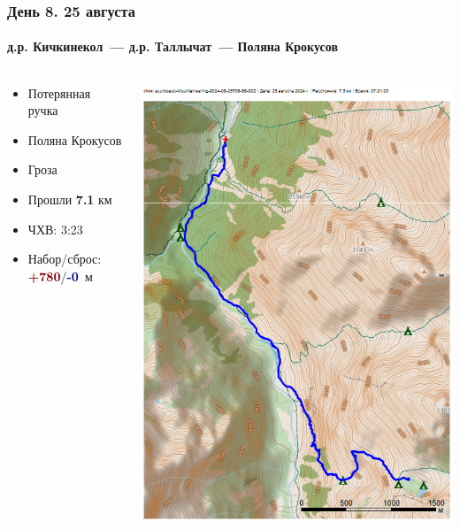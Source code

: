 	\begin{frame}
	\frametitle{День 8. 25 августа}
	\framesubtitle{д.р. Кичкинекол~--- д.р. Таллычат~--- Поляна Крокусов	} %
	\begin{columns}[c] %
		\begin{column}{0.55\textwidth} %
			\begin{itemize}
				\item Потерянная ручка
				\item Поляна Крокусов
				\item Гроза
				\item Прошли \textbf{7.1} км
				\item ЧХВ: 3:23
				\item Набор/сброс: \textcolor{darkred}{\textbf{+780}}/\textcolor{darkblue}{\textbf{-0}}~м
			\end{itemize}
			
		\end{column}
		\begin{column}{0.45\textwidth} %
			\centering
			\includegraphics[width=\linewidth]{../pics/mini_maps/25}
		\end{column}
	\end{columns}
\end{frame}

